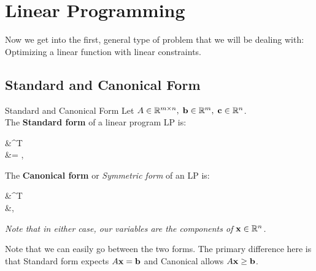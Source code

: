 \pagebreak
\section{Linear Programming}

Now we get into the first, general type of problem that we will be dealing with:
Optimizing a linear function with linear constraints.


\subsection{Standard and Canonical Form}

\begin{defn}{Standard and Canonical Form}{}
Let 
$A \in \mathbb{R}^{m\times n}, \; \mathbf{b} \in \mathbb{R}^m, \; \mathbf{c} \in \mathbb{R}^n$.
\bigskip\\
The \textbf{Standard form} of a linear program LP is:
\begin{frml}
	&\min \vc^T \vx \\
	&\st \vA \vx = \vb, \; \vx \geq \vzero
\end{frml}

The \textbf{Canonical form} or \textit{Symmetric form} of an LP is:
\begin{frml}
&\min \vc^T\vx \\
&\st \vA\vx \geq \vb, \; \vx \geq \vzero
\end{frml}
\textit{Note that in either case, our variables are the components of $\mathbf{x} \in \mathbb{R}^n$.}
\end{defn}

Note that we can easily go between the two forms. The primary difference
here is that Standard form expects $A\mathbf{x} = \mathbf{b}$ and Canonical allows 
$A\mathbf{x} \geq \mathbf{b}$.

